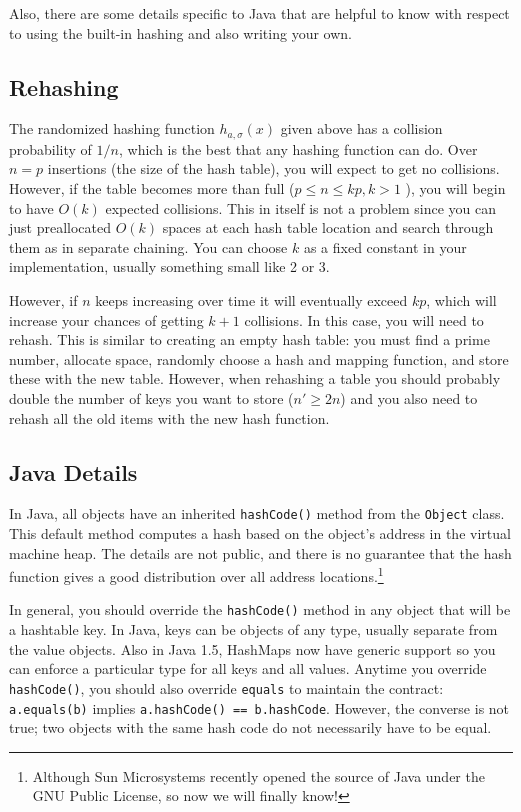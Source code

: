 \documentclass{article}[10pth]
\begin{document}
Also, there are some details specific to Java that are helpful to know
with respect to using the built-in hashing and also writing your own.

\subsection{Rehashing}

The randomized hashing function $h_{a,\sigma}(x)$ given above has
a collision probability of $1/n$, which is the best that any hashing
function can do. Over $n=p$ insertions (the size of the hash table),
you will expect to get no collisions.
However, if the table becomes more than full ($p \le n \le kp, k > 1$ ),
you will begin
to have $O(k)$ expected collisions. This in itself is not a problem
since you can just preallocated $O(k)$ spaces at each hash table location and
search through them as in separate chaining. You can choose $k$ as a fixed
constant in your implementation, usually something small like 2 or 3.

However, if $n$ keeps increasing over time it will eventually exceed $kp$,
which will increase your chances of getting $k+1$ collisions. In this case,
you will need to rehash. This is similar to creating an empty hash table:
you must find a prime number, allocate space, randomly choose a
hash and mapping function, and store these with the new table.
However, when rehashing a table you
should probably double the number of keys you want to
store ($n' \ge 2n$) and you also need to rehash all the old items with
the new hash function.

\subsection{Java Details}

In Java, all objects have an inherited \texttt{hashCode()} method from the
\texttt{Object} class. This default method computes a hash based on the
object's address in the virtual machine heap. The details are not public,
and there is no guarantee that the hash function gives a good distribution
over all address locations.\footnote{Although Sun Microsystems recently opened the source of Java under the GNU Public License, so now we will finally know!}

In general, you should override the \texttt{hashCode()} method in any object
that will be a hashtable key. In Java, keys can be objects of any type,
usually separate from the value objects. Also in Java 1.5, HashMaps now have
generic support so you can enforce a particular type for all keys and all
values. Anytime you override \texttt{hashCode()},
you should also override \texttt{equals} to maintain the contract:
\texttt{a.equals(b)} implies \texttt{a.hashCode() == b.hashCode}. However,
the converse is not true; two objects with the same hash code do not
necessarily have to be equal.
\end{document}
